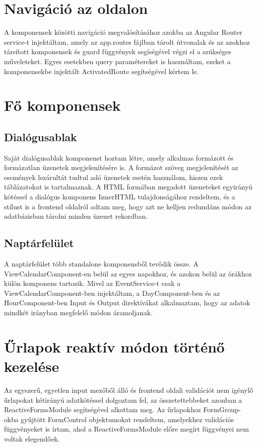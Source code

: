 \documentclass[a4paper,12pt]{report}
\theoremstyle{definition}
\theoremstyle{remark}
\begin{document}
\section{Navigáció az oldalon}

A komponensek közötti navigáció megvalósításához azokba az Angular Router service-t injektáltam, amely az app.routes fájlban tárolt útvonalak és az azokhoz társított komponensek és guard függvények segíségével végzi el a szükséges műveleteket. Egyes esetekben query paramétereket is használtam, ezeket a komponensekbe injektált ActivatedRoute segítségével kértem le.

\section{Fő komponensek}

	\subsection{Dialógusablak}

Saját dialógusablak komponenst hoztam létre, amely alkalmas formázott és formázatlan üzenetek megjelenítésére is. A formázot szöveg megjelenítését az események lezárultát tudtul adó üzenetek esetén használom, hiszen ezek táblázatokat is tartalmaznak.  A HTML formában megadott üzeneteket egyirányú kötéssel a dialógus komponens InnerHTML tulajdonságához rendeltem, és a stílust is a frontend oldalról adtam meg, hogy azt ne kelljen redundáns módon az adatbázisban tárolni minden üzenet rekordban.

	\subsection{Naptárfelület}

A naptárfelület több standalone komponensből tevődik össze. A ViewCalendarComponent-en belül az egyes napokhoz, és azokon belül az órákhoz külön komponens tartozik. Mivel az EventService-t csak a ViewCalendarComponent-ben injektáltam, a DayComponent-ben és az HourComponent-ben Input és Output direktívákat alkalmaztam, hogy az adatok mindkét irányban megfelelő módon áramoljanak.

\section{Űrlapok reaktív módon történő kezelése}

Az egyszerű, egyetlen input mezőből álló és frontend oldali validációt nem igénylő űrlapokat kétirányú adatkötéssel dolgoztam fel, az összetettebbeket azonban a ReactiveFormsModule segítségével alkottam meg. Az űrlapokhoz FormGroup-okba gyűjtött FormControl objektumokat rendeltem, amelyekhez validációs függvényeket is írtam, ahol a ReactiveFormsModule előre megírt függvényei nem voltak elegendőek.
\end{document}
